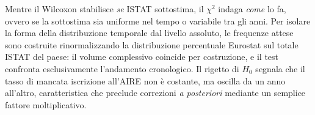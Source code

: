 \begin{enumerate}
    Mentre il Wilcoxon stabilisce \emph{se} ISTAT sottostima,
    il $\chi^2$ indaga \emph{come} lo fa, ovvero se la sottostima
    sia uniforme nel tempo o variabile tra gli anni.
    Per isolare la forma della distribuzione temporale dal livello
    assoluto, le frequenze attese sono costruite rinormalizzando la
    distribuzione percentuale Eurostat sul totale ISTAT del paese:
    il volume complessivo coincide per costruzione, e il test confronta
    esclusivamente l'andamento cronologico.
    Il rigetto di $H_0$ segnala che il tasso di mancata iscrizione
    all'AIRE non è costante, ma oscilla da un anno all'altro,
    caratteristica che preclude correzioni \emph{a posteriori}
    mediante un semplice fattore moltiplicativo.
\end{enumerate}
